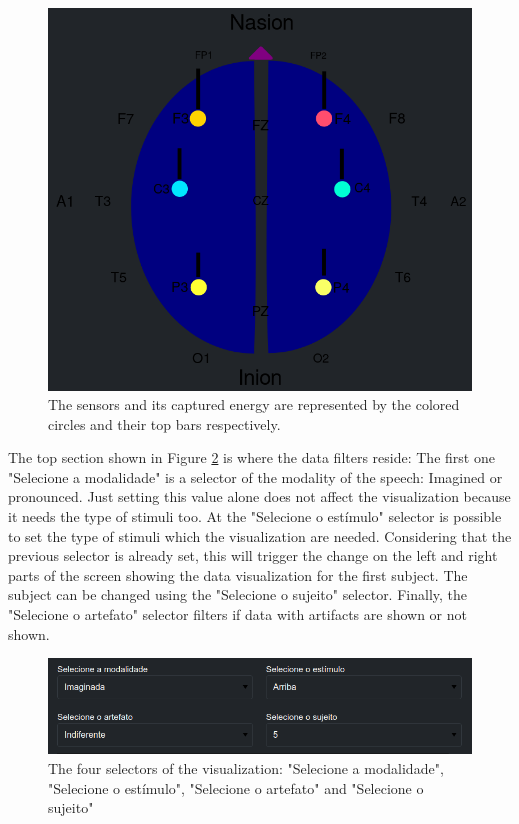 \documentclass[format=sigconf]{acmart}
\begin{document}
			\begin{figure}[h]
				\centering
				\includegraphics[width=\linewidth]{images/screenshotLeft}
				\caption{The sensors and its captured energy are represented by the colored circles and their top bars respectively.}
				\label{fig:screenshotleft}
			\end{figure}
		
			\par The top section shown in Figure \ref{fig:screenshottop} is where the data filters reside: The first one "Selecione a modalidade" is a selector of the modality of the speech: Imagined or pronounced. Just setting this value alone does not affect the visualization because it needs the type of stimuli too. At the "Selecione o estímulo" selector is possible to set the type of stimuli which the visualization are needed. Considering that the previous selector is already set, this will trigger the change on the left and right parts of the screen showing the data visualization for the first subject. The subject can be changed using the "Selecione o sujeito" selector. Finally, the "Selecione o artefato" selector filters if data with artifacts are shown or not shown.
			
			\begin{figure}[h]
				\centering
				\includegraphics[width=\linewidth]{images/screenshotTop}
				\caption{The four selectors of the visualization: "Selecione a modalidade", "Selecione o estímulo", "Selecione o artefato" and "Selecione o sujeito"}
				\label{fig:screenshottop}
			\end{figure}
		
\end{document}
